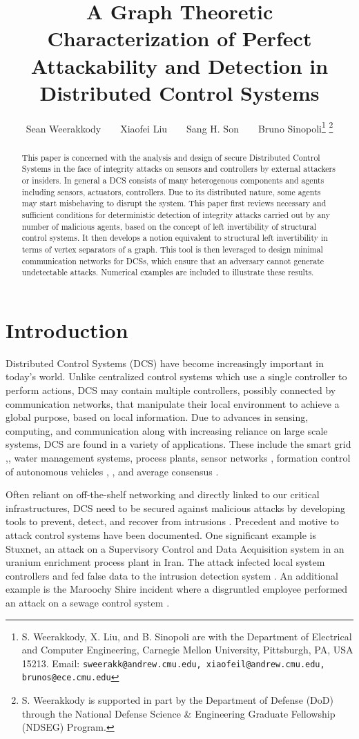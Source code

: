 \documentclass[letterpaper, 10 pt, conference]{ieeeconf}
\title{\LARGE \bf
A Graph Theoretic Characterization of Perfect Attackability and Detection in Distributed Control Systems
}
\author{Sean Weerakkody~~~~Xiaofei Liu~~~~Sang H. Son~~~~Bruno Sinopoli\thanks{S. Weerakkody, X. Liu, and B. Sinopoli are with the Department of Electrical and Computer Engineering, 
			Carnegie Mellon University, Pittsburgh, PA, USA 15213. Email: {\tt\small sweerakk@andrew.cmu.edu, xiaofeil@andrew.cmu.edu, brunos@ece.cmu.edu}}
\thanks{S. Weerakkody is supported in part by the Department of Defense (DoD) through the National Defense Science \& Engineering Graduate Fellowship (NDSEG) Program.}}
\begin{document}
\maketitle
\begin{abstract}
This paper is concerned with the analysis and design of secure Distributed Control Systems in the face of integrity attacks on sensors and controllers by external attackers or insiders. In general a DCS consists of many heterogenous components and agents including sensors, actuators, controllers. Due to its distributed nature, some agents may start misbehaving to disrupt the system. This paper first reviews necessary and sufficient conditions for deterministic detection of integrity attacks carried out by any number of malicious agents, based on the concept of left invertibility of structural control systems. It then develops a notion equivalent to structural left invertibility in terms of vertex separators of a graph. This tool is then leveraged to design minimal communication networks for DCSs, which ensure that an adversary cannot generate undetectable attacks. Numerical examples are included to illustrate these results.


\end{abstract}
\section{Introduction}
Distributed Control Systems (DCS) have become increasingly important in today's world. Unlike centralized control systems which use a single controller to perform actions, DCS may contain multiple controllers, possibly connected by communication networks, that manipulate their local environment to achieve a global purpose, based on local information. Due to advances in sensing, computing, and communication along with increasing reliance on large scale systems, DCS are found in a variety of applications. These include the smart grid \cite{Blaabjerg2006},\cite{Amin2005}, water management systems, process plants, sensor networks \cite{Sinopoli03}, formation control of autonomous vehicles \cite{Olfati2002}, \cite{Ren2008}, and average consensus \cite{Olfati2007}. 

Often reliant on off-the-shelf networking and directly linked to our critical infrastructures, DCS need to be secured against malicious attacks by developing tools to prevent, detect, and recover from intrusions \cite{Cardenas:2008ke}.  Precedent and motive to attack control systems have been documented. One significant example is Stuxnet, an attack on a Supervisory Control and Data Acquisition system in an uranium enrichment process plant in Iran. The attack infected local system controllers and fed false data to the intrusion detection system \cite{Langner2013}. An additional example is the Maroochy Shire incident where a disgruntled employee performed an attack on a sewage control system \cite{Slay2008}. 
\end{document}
